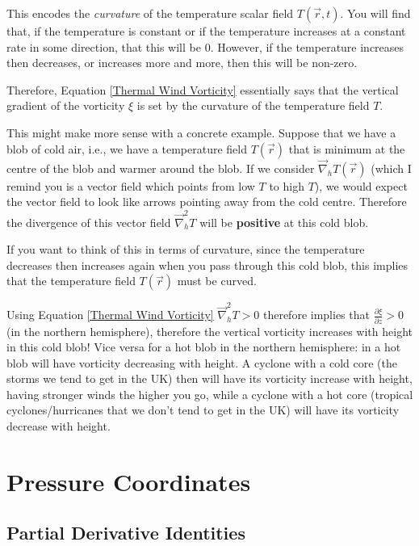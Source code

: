 This encodes the \textit{curvature} of the temperature scalar field \(T(\vec{r},t)\). You will find that, if the temperature is constant or if the temperature increases at a constant rate in some direction, that this will be \(0\). However, if the temperature increases then decreases, or increases more and more, then this will be non-zero.

Therefore, Equation \ref{Thermal Wind Vorticity} essentially says that the vertical gradient of the vorticity \(\xi\) is set by the curvature of the temperature field \(T\). 

This might make more sense with a concrete example. Suppose that we have a blob of cold air, i.e., we have a temperature field \(T(\vec{r})\) that is minimum at the centre of the blob and warmer around the blob. If we consider \(\vec{\nabla}_h T(\vec{r})\) (which I remind you is a vector field which points from low \(T\) to high \(T\)), we would expect the vector field to look like arrows pointing away from the cold centre. Therefore the divergence of this vector field \(\vec{\nabla}_h^2 T\) will be \textbf{positive} at this cold blob.

If you want to think of this in terms of curvature, since the temperature decreases then increases again when you pass through this cold blob, this implies that the temperature field \(T(\vec{r})\) must be curved.  

Using Equation \ref{Thermal Wind Vorticity} \(\vec{\nabla}_h^2 T>0\) therefore implies that \(\frac{\partial \xi}{\partial z}>0\) (in the northern hemisphere), therefore the vertical vorticity increases with height in this cold blob! Vice versa for a hot blob in the northern hemisphere: in a hot blob will have vorticity decreasing with height. A cyclone with a cold core (the storms we tend to get in the UK) then will have its vorticity increase with height, having stronger winds the higher you go, while a cyclone with a hot core (tropical cyclones/hurricanes that we don't tend to get in the UK) will have its vorticity decrease with height.

\section{Pressure Coordinates}\label{Pressure Coords}
\subsection{Partial Derivative Identities}

